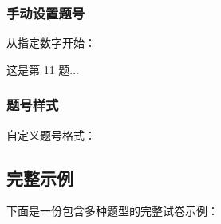 \subsubsection{手动设置题号}

从指定数字开始：

\begin{latexcode}

  \begin{question}
    这是第 11 题...
  \end{question}
\end{latexcode}

\subsubsection{题号样式}

自定义题号格式：

\begin{latexcode}
\end{latexcode}


\subsection{完整示例}

下面是一份包含多种题型的完整试卷示例：

